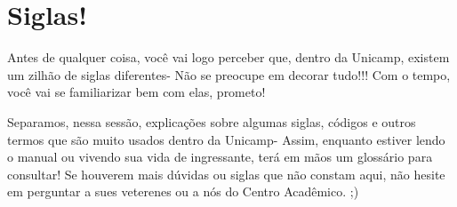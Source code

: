 \section{Siglas!}

Antes de qualquer coisa, você vai logo perceber que, dentro da Unicamp, existem um zilhão de siglas diferentes- Não se preocupe em decorar tudo!!! Com o tempo, você vai se familiarizar bem com elas, prometo!

Separamos, nessa sessão, explicações sobre algumas siglas, códigos e outros termos que são muito usados dentro da Unicamp- Assim, enquanto estiver lendo o manual ou vivendo sua vida de ingressante, terá em mãos um glossário para consultar! Se houverem mais dúvidas ou siglas que não constam aqui, não hesite em perguntar a sues veterenes ou a nós do Centro Acadêmico. ;)

